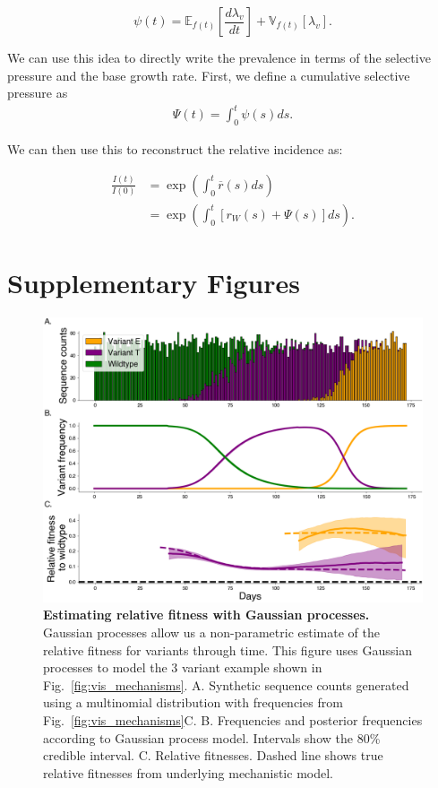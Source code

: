 \documentclass[11pt,oneside,letterpaper]{article}
\newcommand{\Expect}{\mathbb{E}}
\newcommand{\Var}{\mathbb{V}}
\newcommand{\wt}{W}
\begin{document}
\begin{equation}
\psi(t) =  \Expect_{f(t)}\left[ \frac{d \lambda_v}{d t}\right] +  \Var_{f(t)}[\lambda_{v}].
\end{equation}

We can use this idea to directly write the prevalence in terms of the selective pressure and the base growth rate.
First, we define a cumulative selective pressure as
\begin{align*}
\Psi(t) = \int_{0}^{t} \psi(s) ds.
\end{align*}

We can then use this to reconstruct the relative incidence as:

\begin{align*}
    \frac{I(t)}{I(0)} &= \exp\left(\int_{0}^{t} \overline{r}(s) ds\right)\\
         &= \exp \left(\int_{0}^{t} [r_{\wt}(s) + \Psi(s)]ds \right).
\end{align*}


\section*{Supplementary Figures}

\begin{figure}[h]
    \centering
    \includegraphics[width=1.0\linewidth]{./supplementary_figures/gp_example.png}
    \caption{
    \textbf{Estimating relative fitness with Gaussian processes.}
      Gaussian processes allow us a non-parametric estimate of the relative fitness for variants through time.
      This figure uses Gaussian processes to model the 3 variant example shown in Fig.~\ref{fig:vis_mechanisms}.
      A. Synthetic sequence counts generated using a multinomial distribution with frequencies from Fig.~\ref{fig:vis_mechanisms}C.
      B. Frequencies and posterior frequencies according to Gaussian process model. Intervals show the 80\% credible interval.
      C. Relative fitnesses. Dashed line shows true relative fitnesses from underlying mechanistic model.
    }
    \label{fig:gp_example}
\end{figure}
\end{document}
